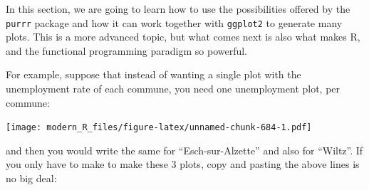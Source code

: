 \documentclass[]{gitbook}
\newenvironment{Shaded}{\begin{snugshade}}{\end{snugshade}}
\newcommand{\DataTypeTok}[1]{\textcolor[rgb]{0.13,0.29,0.53}{#1}}
\newcommand{\KeywordTok}[1]{\textcolor[rgb]{0.13,0.29,0.53}{\textbf{#1}}}
\newcommand{\NormalTok}[1]{#1}
\newcommand{\OperatorTok}[1]{\textcolor[rgb]{0.81,0.36,0.00}{\textbf{#1}}}
\newcommand{\StringTok}[1]{\textcolor[rgb]{0.31,0.60,0.02}{#1}}
\begin{document}
In this section, we are going to learn how to use the possibilities offered by the \texttt{purrr} package
and how it can work together with \texttt{ggplot2} to generate many plots. This is a more advanced topic,
but what comes next is also what makes R, and the functional programming paradigm so powerful.

For example, suppose that instead of wanting a single plot with the unemployment rate of each
commune, you need one unemployment plot, per commune:

\begin{Shaded}
\end{Shaded}

\texttt{[image: modern\_R\_files/figure-latex/unnamed-chunk-684-1.pdf]}

and then you would write the same for ``Esch-sur-Alzette'' and also for ``Wiltz''. If you only have to
make to make these 3 plots, copy and pasting the above lines is no big deal:

\begin{Shaded}
\end{Shaded}
\end{document}
